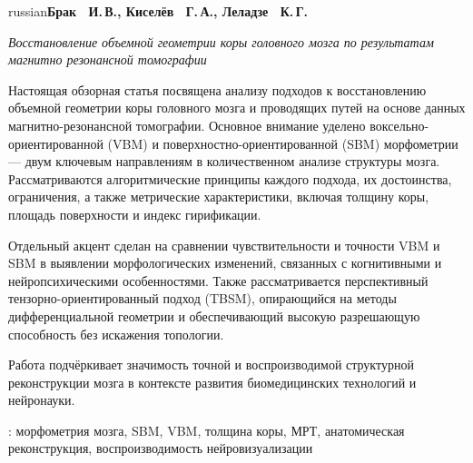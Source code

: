 \par \begin {otherlanguage*}{russian}\makeatletter \textbf {Брак ~И.\unhbox \voidb@x \nobreak \,В.\unskip {}, \ignorespaces Киселёв ~Г.\unhbox \voidb@x \nobreak \,А.\unskip {}, \ignorespaces Леладзе ~К.\unhbox \voidb@x \nobreak \,Г.}\makeatother \par \textit {Восстановление объемной геометрии коры головного мозга по результатам магнитно резонансной томографии}\par Настоящая обзорная статья посвящена анализу подходов к восстановлению объемной геометрии коры головного мозга и проводящих путей на основе данных магнитно-резонансной томографии. Основное внимание уделено воксельно-ориентированной (VBM) и поверхностно-ориентированной (SBM) морфометрии — двум ключевым направлениям в количественном анализе структуры мозга. Рассматриваются алгоритмические принципы каждого подхода, их достоинства, ограничения, а также метрические характеристики, включая толщину коры, площадь поверхности и индекс гирификации. \par Отдельный акцент сделан на сравнении чувствительности и точности VBM и SBM в выявлении морфологических изменений, связанных с когнитивными и нейропсихическими особенностями. Также рассматривается перспективный тензорно-ориентированный подход (TBSM), опирающийся на методы дифференциальной геометрии и обеспечивающий высокую разрешающую способность без искажения топологии. \par Работа подчёркивает значимость точной и воспроизводимой структурной реконструкции мозга в контексте развития биомедицинских технологий и нейронауки. \par \keywordsname : морфометрия мозга, SBM, VBM, толщина коры, МРТ, анатомическая реконструкция, воспроизводимость нейровизуализации \par \end {otherlanguage*}\par \vspace \bigskipamount 
